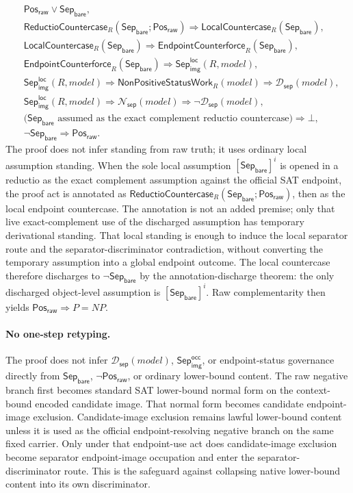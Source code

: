 \documentclass[11pt]{article}
\theoremstyle{definition}
\theoremstyle{remark}
\newcommand{\PosRaw}{\mathsf{Pos}_{\mathsf{raw}}}
\newcommand{\SepBare}{\mathsf{Sep}_{\mathsf{bare}}}
\newcommand{\SepImgOcc}{\mathsf{Sep}_{\mathsf{img}}^{\mathsf{occ}}}
\newcommand{\LocalSepImgOcc}{\mathsf{Sep}_{\mathsf{img}}^{\mathsf{loc}}}
\newcommand{\SepDisc}{\mathcal{D}_{\mathsf{sep}}}
\newcommand{\NoSepDisc}{\mathcal{N}_{\mathsf{sep}}}
\newcommand{\NonPositiveStatusWork}{\mathsf{NonPositiveStatusWork}}
\newcommand{\EndpointCounterforce}{\mathsf{EndpointCounterforce}}
\newcommand{\LocalCountercase}{\mathsf{LocalCountercase}}
\newcommand{\ReductioCountercase}{\mathsf{ReductioCountercase}}
\begin{document}
\[
\begin{aligned}
  &\PosRaw\vee\SepBare,\\[2pt]
  &\ReductioCountercase_R(\SepBare;\PosRaw)\Rightarrow\LocalCountercase_R(\SepBare),\\[2pt]
  &\LocalCountercase_R(\SepBare)\Rightarrow\EndpointCounterforce_R(\SepBare),\\[2pt]
  &\EndpointCounterforce_R(\SepBare)\Rightarrow\LocalSepImgOcc(R,model),\\[2pt]
  &\LocalSepImgOcc(R,model)\Rightarrow\NonPositiveStatusWork_R(model)\Rightarrow\SepDisc(model),\\[2pt]
  &\LocalSepImgOcc(R,model)\Rightarrow\NoSepDisc(model)\Rightarrow\neg\SepDisc(model),\\[2pt]
  &\bigl(\SepBare\text{ assumed as the exact complement reductio countercase}\bigr)\Rightarrow\bot,\\[2pt]
  &\neg\SepBare\Rightarrow\PosRaw.
\end{aligned}
\]
The proof does not infer standing from raw truth; it uses ordinary local assumption standing. When the sole local assumption \([\SepBare]^i\) is opened in a reductio as the exact complement assumption against the official SAT endpoint, the proof act is annotated as \(\ReductioCountercase_R(\SepBare;\PosRaw)\), then as the local endpoint countercase. The annotation is not an added premise; only that live exact-complement use of the discharged assumption has temporary derivational standing. That local standing is enough to induce the local separator route and the separator-discriminator contradiction, without converting the temporary assumption into a global endpoint outcome. The local countercase therefore discharges to \(\neg\SepBare\) by the annotation-discharge theorem: the only discharged object-level assumption is \([\SepBare]^i\). Raw complementarity then yields \(\PosRaw\Rightarrow P=NP\).
\paragraph{No one-step retyping.}
The proof does not infer \(\SepDisc(model)\), \(\SepImgOcc\), or endpoint-status governance directly from \(\SepBare\), \(\neg\PosRaw\), or ordinary lower-bound content. The raw negative branch first becomes standard SAT lower-bound normal form on the context-bound encoded candidate image. That normal form becomes candidate endpoint-image exclusion. Candidate-image exclusion remains lawful lower-bound content unless it is used as the official endpoint-resolving negative branch on the same fixed carrier. Only under that endpoint-use act does candidate-image exclusion become separator endpoint-image occupation and enter the separator-discriminator route. This is the safeguard against collapsing native lower-bound content into its own discriminator.
\end{document}
